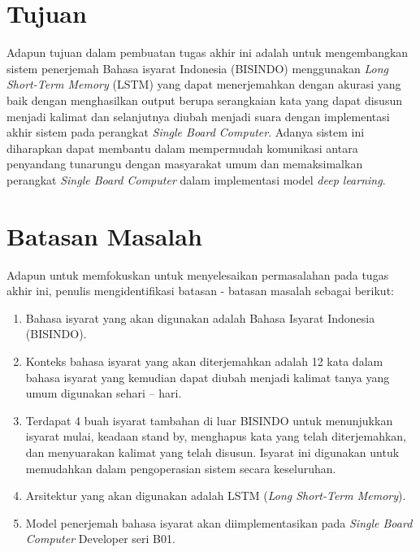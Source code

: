 \section{Tujuan}
\label{sec:Tujuan}

Adapun tujuan dalam pembuatan tugas akhir ini adalah untuk mengembangkan sistem penerjemah Bahasa isyarat Indonesia (BISINDO) menggunakan \emph{Long Short-Term Memory} (LSTM) yang dapat menerjemahkan dengan akurasi yang baik dengan menghasilkan output berupa serangkaian kata yang dapat disusun menjadi kalimat dan selanjutnya diubah menjadi suara dengan implementasi akhir sistem pada perangkat \emph{Single Board Computer}. Adanya sistem ini diharapkan dapat membantu dalam mempermudah komunikasi antara penyandang tunarungu dengan masyarakat umum dan memaksimalkan perangkat \emph{Single Board Computer} dalam implementasi model \emph{deep learning}.  

\newpage

\section{Batasan Masalah}
\label{sec:batasanmasalah}

Adapun untuk memfokuskan untuk menyelesaikan permasalahan pada tugas akhir ini, penulis mengidentifikasi batasan - batasan masalah sebagai berikut:

\begin{enumerate}[nolistsep]

  \item Bahasa isyarat yang akan digunakan adalah Bahasa Isyarat Indonesia (BISINDO).

  \item Konteks bahasa isyarat yang akan diterjemahkan adalah 12 kata dalam bahasa isyarat yang kemudian dapat diubah menjadi kalimat tanya yang umum digunakan sehari – hari.

  \item Terdapat 4 buah isyarat tambahan di luar BISINDO untuk menunjukkan isyarat mulai, keadaan stand by, menghapus kata yang telah diterjemahkan, dan menyuarakan kalimat yang telah disusun. Isyarat ini digunakan untuk memudahkan dalam pengoperasian sistem secara keseluruhan.

  \item Arsitektur yang akan digunakan adalah LSTM (\emph{Long Short-Term Memory}).
  
  \item Model penerjemah bahasa isyarat akan diimplementasikan pada \emph{Single Board Computer} Developer seri B01.
\end{enumerate}

